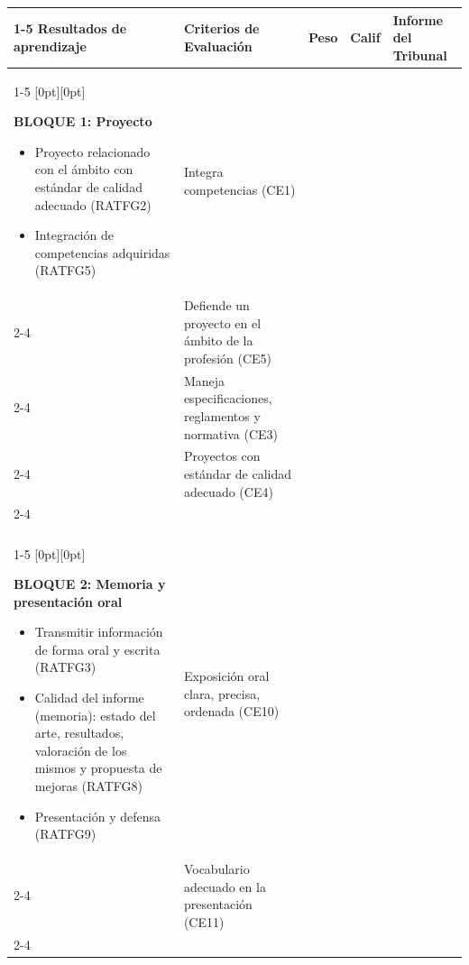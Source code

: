 \begin{landscape}
\begin{minipage}[t][\dimexpr\textheight-\topskip\relax][t]{\linewidth}
{\fontsize{10}{12}\selectfont
\begin{tabularx}{\linewidth}{|p{7cm}|p{9cm}|p{1cm}|p{1cm}|p{5cm}|}
\cline{1-5}
\textbf{Resultados de aprendizaje} & \textbf{Criterios de Evaluación} & \textbf{Peso} & \textbf{Calif} & \textbf{Informe del Tribunal} \\ \cline{1-5}
  \raisebox{0pt}[0pt][0pt]{%
  \begin{minipage}[t]{7cm}
    \textbf{BLOQUE 1: Proyecto}
    \begin{itemize}[left=5pt, itemsep=1pt, topsep=1pt]
      \item Proyecto relacionado con el ámbito con estándar de calidad adecuado (RATFG2)
      \item Integración de competencias adquiridas (RATFG5)
    \end{itemize}
  \end{minipage}}
    & Integra competencias (CE1) &  &  &  \\ \cline{2-4}
    & Defiende un proyecto en el ámbito de la profesión (CE5) &  &  &  \\ \cline{2-4}
    & Maneja especificaciones, reglamentos y normativa (CE3) & & & \\ \cline{2-4}
    & Proyectos con estándar de calidad adecuado (CE4) & & & \\ \cline{2-4}
    & \cellcolor[HTML]{C0C0C0}\strut & & & \\
    & \cellcolor[HTML]{C0C0C0}\multirow[c]{-2}{=}{\hspace*{2mm}\textbf{Calificación}} & \multirow[c]{-2}{=}{\centering 3} & & \\ \cline{1-5}
  \raisebox{0pt}[0pt][0pt]{%
  \begin{minipage}[t]{7cm}
    \textbf{BLOQUE 2: Memoria y presentación oral}
    \begin{itemize}[left=5pt, itemsep=1pt, topsep=1pt]
      \item Transmitir información de forma oral y escrita (RATFG3)
      \item Calidad del informe (memoria): estado del arte, resultados, valoración de los mismos y propuesta de mejoras (RATFG8)
      \item Presentación y defensa (RATFG9)
    \end{itemize}
  \end{minipage}}
    & Exposición oral clara, precisa, ordenada (CE10) &  &  &  \multirow[t]{8}{=}{} \\ \cline{2-4}
    & Vocabulario adecuado en la presentación (CE11)   &  &  & \\ \cline{2-4}

\end{tabularx}}
\end{minipage}
\end{landscape}
